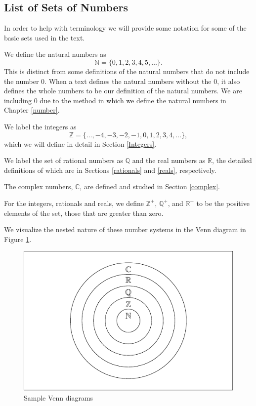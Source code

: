 \documentclass[
]{book}
\theoremstyle{definition}
\theoremstyle{definition}
\theoremstyle{definition}
\theoremstyle{definition}
\theoremstyle{remark}
\begin{document}
\hypertarget{list-of-sets-of-numbers}{%
\subsection{List of Sets of Numbers}\label{list-of-sets-of-numbers}}

In order to help with terminology we will provide some notation for some of the basic sets used in the text.

We define the natural numbers as
\[\mathbb{N}=\{0,1,2,3,4,5,\ldots\}.\]
This is distinct from some definitions of the natural numbers that do not include the number \(0\). When a text defines the natural numbers without the \(0\), it also defines the whole numbers to be our definition of the natural numbers. We are including \(0\) due to the method in which we define the natural numbers in Chapter \ref{number}.

We label the integers as \[\mathbb{Z} = \{\ldots, -4, -3, -2, -1, 0, 1, 2, 3, 4, \ldots\},\] which we will define in detail in Section \ref{Integers}.

We label the set of rational numbers as \(\mathbb{Q}\) and the real numbers as \(\mathbb{R}\), the detailed definitions of which are in Sections \ref{rationals} and \ref{reals}, respectively.

The complex numbers, \(\mathbb{C}\), are defined and studied in Section \ref{complex}.

For the integers, rationals and reals, we define \(\mathbb{Z}^+\), \(\mathbb{Q}^+\), and \(\mathbb{R}^+\) to be the positive elements of the set, those that are greater than zero.

We visualize the nested nature of these number systems in the Venn diagram in Figure \ref{fig:venn-numbers}.

\begin{figure}

{\centering \includegraphics[width=0.7\linewidth]{tikz/vennNumberSystems} 

}

\caption{Sample Venn diagrams}\label{fig:venn-numbers}
\end{figure}
\end{document}
